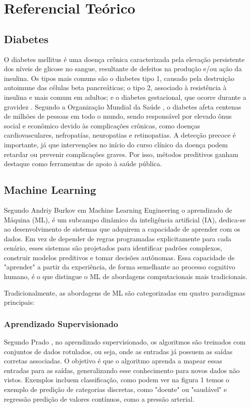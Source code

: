 \chapter{Referencial Teórico}
\section{Diabetes}
O diabetes mellitus é uma doença crônica caracterizada pela elevação persistente dos níveis de glicose no sangue, resultante de defeitos na produção e/ou ação da insulina. Os tipos mais comuns são o diabetes tipo 1, causado pela destruição autoimune das células beta pancreáticas; o tipo 2, associado à resistência à insulina e mais comum em adultos; e o diabetes gestacional, que ocorre durante a gravidez \cite{BRASIL2022}. Segundo a Organização Mundial da Saúde \cite{WHO2021}, o diabetes afeta centenas de milhões de pessoas em todo o mundo, sendo responsável por elevado ônus social e econômico devido às complicações crônicas, como doenças cardiovasculares, nefropatías, neuropatias e retinopatias. A detecção precoce é importante, já que intervenções no início do curso clínico da doença podem retardar ou prevenir complicações graves. Por isso, métodos preditivos ganham destaque como ferramentas de apoio à saúde pública.

\section{Machine Learning}
Segundo Andriy Burkov\cite{Burkov2020} em Machine Learning Engineering o aprendizado de Máquina (ML), é um subcampo dinâmico da inteligência artificial (IA), dedica-se ao desenvolvimento de sistemas que adquirem a capacidade de aprender com os dados. Em vez de depender de regras programadas explicitamente para cada cenário, esses sistemas são projetados para identificar padrões complexos, construir modelos preditivos e tomar decisões autônomas. Essa capacidade de "aprender" a partir da experiência, de forma semelhante ao processo cognitivo humano, é o que distingue o ML de abordagens computacionais mais tradicionais.

Tradicionalmente, as abordagens de ML são categorizadas em quatro paradigmas principais:

\subsection{Aprendizado Supervisionado}
Segundo Prado \cite{Prado2001}, no aprendizado supervisionado, os algoritmos são treinados com conjuntos de dados rotulados, ou seja, onde as entradas já possuem as saídas corretas associadas. O objetivo é que o algoritmo aprenda a mapear essas entradas para as saídas, generalizando esse conhecimento para novos dados não vistos. Exemplos incluem classificação, como podem ver na figura 1 temos o exemplo de predição de categorias discretas, como "doente" ou "saudável" e regressão predição de valores contínuos, como a pressão arterial. \cite{Feitosa2024}

